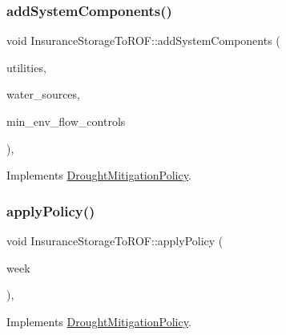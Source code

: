 \subsubsection{\texorpdfstring{add\+System\+Components()}{addSystemComponents()}}
{\footnotesize\ttfamily void Insurance\+Storage\+To\+R\+O\+F\+::add\+System\+Components (\begin{DoxyParamCaption}\item[{vector$<$ \mbox{\hyperlink{classUtility}{Utility}} $\ast$$>$}]{utilities,  }\item[{vector$<$ \mbox{\hyperlink{classWaterSource}{Water\+Source}} $\ast$$>$}]{water\+\_\+sources,  }\item[{vector$<$ \mbox{\hyperlink{classMinEnvFlowControl}{Min\+Env\+Flow\+Control}} $\ast$$>$}]{min\+\_\+env\+\_\+flow\+\_\+controls }\end{DoxyParamCaption})\hspace{0.3cm}{\ttfamily [override]}, {\ttfamily [virtual]}}



Implements \mbox{\hyperlink{classDroughtMitigationPolicy_aaab042a79d781afe8e08753b7012372a}{Drought\+Mitigation\+Policy}}.

\mbox{\label{classInsuranceStorageToROF_a17aa84e0559793b3c463c468dfda3753}} 
\subsubsection{\texorpdfstring{apply\+Policy()}{applyPolicy()}}
{\footnotesize\ttfamily void Insurance\+Storage\+To\+R\+O\+F\+::apply\+Policy (\begin{DoxyParamCaption}\item[{int}]{week }\end{DoxyParamCaption})\hspace{0.3cm}{\ttfamily [override]}, {\ttfamily [virtual]}}



Implements \mbox{\hyperlink{classDroughtMitigationPolicy_a76c1a85eaf7707306fe173b6437cc31d}{Drought\+Mitigation\+Policy}}.

\mbox{\label{classInsuranceStorageToROF_a4a50c4b15aba302fe1e928fb0cc66d32}} 
